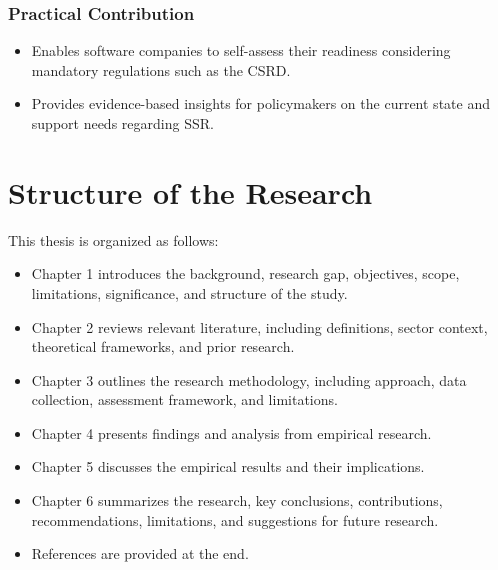 \subsubsection{Practical Contribution}
\begin{itemize}
    \item Enables software companies to self-assess their readiness considering mandatory regulations such as the CSRD.
    \item Provides evidence-based insights for policymakers on the current state and support needs regarding SSR.
\end{itemize}

\section{Structure of the Research}
This thesis is organized as follows:
\begin{itemize}
    \item Chapter 1 introduces the background, research gap, objectives, scope, limitations, significance, and structure of the study.
    \item Chapter 2 reviews relevant literature, including definitions, sector context, theoretical frameworks, and prior research.
    \item Chapter 3 outlines the research methodology, including approach, data collection, assessment framework, and limitations.
    \item Chapter 4 presents findings and analysis from empirical research.
    \item Chapter 5 discusses the empirical results and their implications.
    \item Chapter 6 summarizes the research, key conclusions, contributions, recommendations, limitations, and suggestions for future research.
    \item References are provided at the end.
\end{itemize}